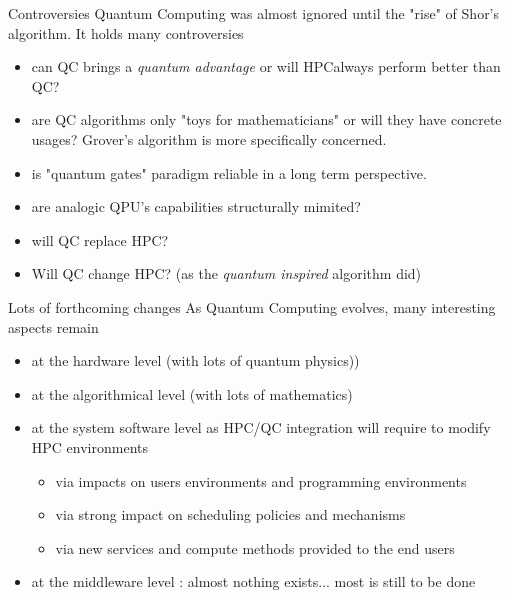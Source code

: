 \begin{frame}{Controversies}
Quantum Computing was almost ignored until the "rise" of Shor's algorithm. It holds many controversies
\begin{itemize}
    \item can QC brings a \textit{quantum advantage} or will HPCalways perform better than QC?
    \item are QC algorithms only "toys for mathematicians" or will they have concrete usages? Grover's algorithm is
    more specifically concerned.
    \item is "quantum gates" paradigm reliable in a long term perspective.
    \item are analogic QPU's capabilities structurally mimited?
    \item will QC replace HPC?
    \item Will QC change HPC? (as the \textit{quantum inspired} algorithm did)
\end{itemize}
\end{frame}

\begin{frame}{Lots of forthcoming changes}
As Quantum Computing evolves, many interesting aspects remain
\begin{itemize}
    \item at the hardware level (with lots of quantum physics))
    \item at the algorithmical level (with lots of mathematics)
    \item at the system software level as HPC/QC integration will require to modify HPC environments
    \begin{itemize}
        \item via impacts on users environments and programming environments
        \item via strong impact on scheduling policies and mechanisms
        \item via new services and compute methods provided to the end users
    \end{itemize}
    \item at the middleware level : almost nothing exists... most is still to be done
\end{itemize}
\end{frame}
